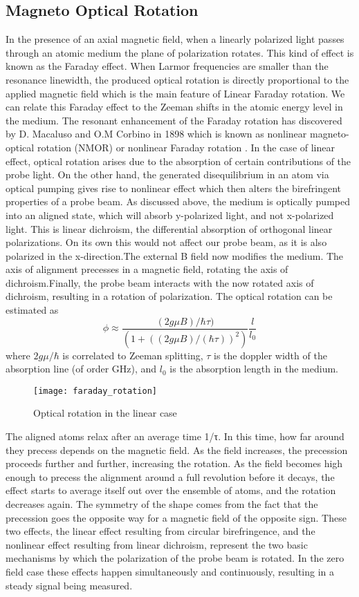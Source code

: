 \documentclass[12pt]{report}
\begin{document}
\subsection{Magneto Optical Rotation}
\bigskip
In the presence of an axial magnetic field, when a linearly polarized light passes through an atomic medium the plane of polarization rotates. This kind of effect is known as the Faraday effect. When Larmor frequencies are smaller than the resonance linewidth, the produced optical rotation is directly proportional to the applied magnetic field which is the main feature of Linear Faraday rotation. We can relate this Faraday effect to the Zeeman shifts in the atomic energy level in the medium. The resonant enhancement of the Faraday rotation has discovered by D. Macaluso and O.M Corbino in 1898 which is known as nonlinear magneto-optical rotation (NMOR) or nonlinear Faraday rotation \cite{budker2013optical}. In the case of linear effect, optical rotation arises due to the absorption of certain contributions of the probe light. On the other hand, the generated disequilibrium in an atom via optical pumping gives rise to nonlinear effect which then alters the birefringent properties of a probe beam. 
As discussed above, the medium is optically pumped into an aligned state, which will
absorb y-polarized light, and not x-polarized light. This is linear dichroism, the differential absorption of orthogonal linear polarizations. On its own this would not affect our probe beam, as it is also polarized in the x-direction.The external B field now modifies the medium. The axis of alignment precesses in a
magnetic field, rotating the axis of dichroism.Finally, the probe beam interacts with the now rotated axis of dichroism, resulting in a rotation of polarization.
The optical rotation can be estimated as
\begin{equation}
\phi \approx \frac{(2g\mu B)/ \hbar\tau)}{(1+((2g\mu B)/(\hbar\tau))^2 )}\frac{l}{l_0}
\end{equation}
where $2g\mu/\hbar$ is correlated to Zeeman splitting, $\tau$ is the doppler width of the
absorption line (of order GHz), and $l_0$ is the absorption length in the medium. 
\begin{figure}
\centering
\texttt{[image: faraday\_rotation]}
\caption{Optical rotation in the linear case\cite{auzinsh2010optically}}
\end{figure}
The aligned atoms relax after an average time 1/τ. In this time, how far around they precess depends on the magnetic field. As the field increases, the precession proceeds further and further, increasing the rotation. As the field becomes high enough to precess the alignment around a full revolution before it decays, the effect starts to average itself out over the ensemble of atoms, and the rotation decreases again. The symmetry of the shape comes from the fact that the precession goes the opposite way for a magnetic field of the opposite sign.
These two effects, the linear effect resulting from circular birefringence, and the nonlinear effect resulting from linear dichroism, represent the two basic mechanisms by which the polarization of the probe beam is rotated. In the zero field case these effects happen simultaneously and continuously, resulting in a steady signal being measured.
\end{document}
